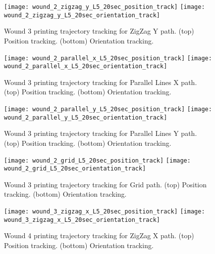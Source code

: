 \begin{figure}[htbp]
	\centering
	\texttt{[image: wound\_2\_zigzag\_y\_L5\_20sec\_position\_track]}
	\texttt{[image: wound\_2\_zigzag\_y\_L5\_20sec\_orientation\_track]}
\caption[Wound 3 printing trajectory tracking for ZigZag Y path.]{Wound 3 printing trajectory tracking for ZigZag Y path. (top) Position tracking. (bottom) Orientation tracking.}
	\label{fig:simulation_test_results_appendix_trajectory_tracking_wound_3_zizzag_y_tracking}
\end{figure}

\begin{figure}[htbp]
	\centering
	\texttt{[image: wound\_2\_parallel\_x\_L5\_20sec\_position\_track]}
	\texttt{[image: wound\_2\_parallel\_x\_L5\_20sec\_orientation\_track]}
	\caption[Wound 3 printing trajectory tracking for Parallel Lines X path.]{Wound 3 printing trajectory tracking for Parallel Lines X path. (top) Position tracking. (bottom) Orientation tracking.}
	\label{fig:simulation_test_results_appendix_trajectory_tracking_wound_3_parallel_x_tracking}
\end{figure}

\begin{figure}[htbp]
	\centering
	\texttt{[image: wound\_2\_parallel\_y\_L5\_20sec\_position\_track]}
	\texttt{[image: wound\_2\_parallel\_y\_L5\_20sec\_orientation\_track]}
    \caption[Wound 3 printing trajectory tracking for Parallel Lines Y path.]{Wound 3 printing trajectory tracking for Parallel Lines Y path. (top) Position tracking. (bottom) Orientation tracking.}
	\label{fig:simulation_test_results_appendix_trajectory_tracking_wound_3_parallel_y_tracking}
\end{figure}

\begin{figure}[htbp]
	\centering
	\texttt{[image: wound\_2\_grid\_L5\_20sec\_position\_track]}
	\texttt{[image: wound\_2\_grid\_L5\_20sec\_orientation\_track]}
    \caption[Wound 3 printing trajectory tracking for Grid path.]{Wound 3 printing trajectory tracking for Grid path. (top) Position tracking. (bottom) Orientation tracking.}
	\label{fig:simulation_test_results_appendix_trajectory_tracking_wound_3_grid_tracking}
\end{figure}


\begin{figure}[htbp]
	\centering
	\texttt{[image: wound\_3\_zigzag\_x\_L5\_20sec\_position\_track]}
	\texttt{[image: wound\_3\_zigzag\_x\_L5\_20sec\_orientation\_track]}
	\caption[Wound 4 printing trajectory tracking for ZigZag X path.]{Wound 4 printing trajectory tracking for ZigZag X path. (top) Position tracking. (bottom) Orientation tracking.}
    \label{fig:simulation_test_results_appendix_trajectory_tracking_wound_4_zizzag_x_tracking}
\end{figure}

